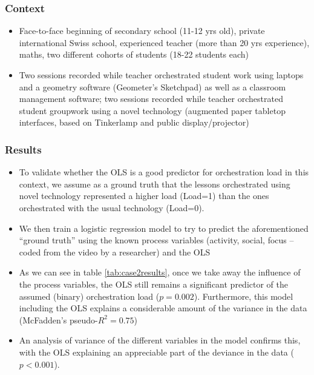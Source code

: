 \documentclass[10pt,journal,compsoc]{IEEEtran}
\begin{document}
\subsubsection{Context}

\begin{itemize}
\item Face-to-face beginning of secondary school (11-12 yrs old), private international Swiss school, experienced teacher (more than 20 yrs experience), maths, two different cohorts of students (18-22 students each) %
\item Two sessions recorded while teacher orchestrated student work using laptops and a geometry software (Geometer's Sketchpad) as well as a classroom management software; two sessions recorded while teacher orchestrated student groupwork using a novel technology (augmented paper tabletop interfaces, based on Tinkerlamp \cite{do2012tinkerlamp} and public display/projector)
\end{itemize}

\subsubsection{Results}

\begin{itemize}
\item To validate whether the OLS is a good predictor for orchestration load in this context, we assume as a ground truth that the lessons orchestrated using novel technology represented a higher load (Load=1) than the ones orchestrated with the usual technology (Load=0). 
\item We then train a logistic regression model to try to predict the aforementioned ``ground truth'' using the known process variables (activity, social, focus -- coded from the video by a researcher) and the OLS
\item As we can see in table \ref{tab:case2results}, once we take away the influence of the process variables, the OLS still remains a significant predictor of the assumed (binary) orchestration load ($p=0.002$). Furthermore, this model including the OLS explains a considerable amount of the variance in the data (McFadden's pseudo-$R^2=0.75$) 
\item An analysis of variance of the different variables in the model confirms this, with the OLS explaining an appreciable part of the deviance in the data ($p<0.001$). 
\end{itemize}
\end{document}
